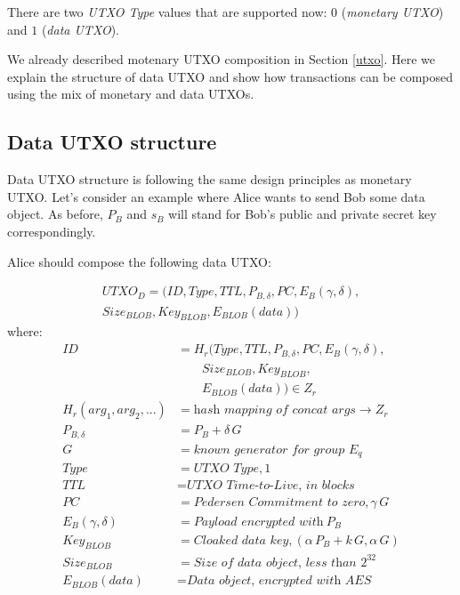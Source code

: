 \documentclass[a4paper, 10pt, conference]{ieeeconf}
\begin{document}
There are two \textit{UTXO Type} values that are supported now: $0$ (\textit{monetary UTXO}) and $1$ (\textit{data UTXO}).

We already described motenary UTXO composition in Section \ref{utxo}. Here we explain the structure of data UTXO and show how transactions can be composed using the mix of monetary and data UTXOs.

\subsection{Data UTXO structure}

Data UTXO structure is following the same design principles as monetary UTXO. Let's consider an example where Alice wants to send Bob some data object. As before, $P_B$ and $s_B$ will stand for Bob's public and private secret key correspondingly. 

Alice should compose the following data UTXO:

\begin{multline*}
UTXO_D = (ID, Type, TTL, P_{B, \delta}, PC, E_B(\gamma, \delta), \\
Size_{BLOB}, Key_{BLOB}, E_{BLOB}(data))
\end{multline*}
	where:
\begin{align*}
	ID &= H_r(Type, TTL, P_{B, \delta}, PC, E_B(\gamma, \delta), \\
	& \ \ \ \ \ \ \ \ \ Size_{BLOB}, Key_{BLOB}, \\
	& \ \ \ \ \ \ \ \ \ E_{BLOB}(data)) \in Z_r \\	
	H_r(arg_1, arg_2, ...) &= \textit{hash mapping of concat args} \rightarrow Z_r \\
	P_{B, \delta} &= P_B + \delta \, G \\
	G &= \textit{known generator for group } E_q \\
	Type &= \textit{UTXO Type}, 1\\
	TTL &= \textit{UTXO Time-to-Live, in blocks}\\
	PC &= \textit{Pedersen Commitment to zero}, \gamma \, G \\
	E_B(\gamma, \delta) &= \textit{Payload encrypted with}\  P_B \\
	Key_{BLOB} &= \textit{Cloaked data key}, (\alpha \, P_{B} + k \, G, \alpha \, G )\\
	Size_{BLOB} &= \textit{Size of data object, less than $2^{32}$}\\
	E_{BLOB}(data) &= \textit{Data object, encrypted with AES}
\end{align*}
\end{document}
